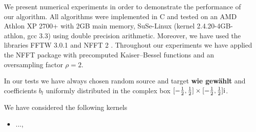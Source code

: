 \documentclass[11pt,a4paper,twoside,bibtotoc]{scrartcl}
\theoremstyle{plain}
\theoremstyle{definition}
\theoremstyle{remark}
\numberwithin{equation}{section}
\numberwithin{table}{section}
\numberwithin{figure}{section}
\begin{document}
We present numerical experiments in order to demonstrate the performance of
our algorithm.
All algorithms were implemented in C and tested on an AMD Athlon\texttrademark
XP 2700+ with 2GB main memory, SuSe-Linux (kernel 2.4.20-4GB-athlon, gcc 3.3)
using double precision arithmetic. 
Moreover, we have used the libraries FFTW 3.0.1 \cite{fftw} and NFFT 2
\cite{kupo02C}. 
Throughout our experiments we have applied the NFFT package \cite{kupo02C}
with precomputed Kaiser--Bessel functions and an oversampling factor $\rho=2$.

In our tests we have always chosen random source and target {\bf wie gewählt}
and coefficients $b_l$ uniformly distributed in the complex box
$[-\frac{1}{2},\frac{1}{2}]\times [-\frac{1}{2},\frac{1}{2}]{\rm i}$.

We have considered the following kernels

\begin{itemize}
\item ...,
\end{itemize}
\end{document}
